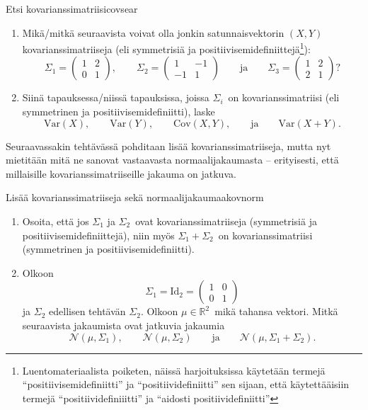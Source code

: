\documentclass[11pt,a4paper]{amsart}
\newcommand{\R}{\mathbb{R}}
\newcommand{\1}{\mathbf{1}}
\begin{document}
\begin{Exercises}{Etsi kovarianssimatriisi}{covsear}
\begin{enumerate}
\item Mikä/mitkä seuraavista voivat olla jonkin satunnaisvektorin $(X,Y)$ kovarianssimatriiseja (eli symmetrisiä ja positiivisemidefiniittejä\footnote{Luentomateriaalista poiketen, näissä harjoituksissa käytetään termejä ``positiivisemidefiniitti'' ja ``positiividefiniitti'' sen sijaan, että käytettääisiin termejä ``positiividefiniiitti'' ja ``aidosti positiividefiniitti''}): 
\[
\Sigma_1=\begin{pmatrix}
1 & 2\\
0 & 1
\end{pmatrix}, \qquad \Sigma_2=\begin{pmatrix}
1 & -1\\
-1 & 1
\end{pmatrix} \qquad \text{ja} \qquad \Sigma_3=\begin{pmatrix}
1 & 2\\
2 & 1
\end{pmatrix}?
\]

\item Siinä tapauksessa/niissä tapauksissa, joissa $\Sigma_i$ on kovarianssimatriisi (eli symmetrinen ja positiivisemidefiniitti), laske 
\[
\mathrm{Var}(X), \qquad \mathrm{Var}(Y), \qquad \mathrm{Cov}(X,Y), \qquad \text{ja} \qquad \mathrm{Var}(X+Y).
\]

\end{enumerate}
\end{Exercises}

Seuraavassakin tehtävässä pohditaan lisää kovarianssimatriiseja, mutta nyt mietitään mitä ne sanovat vastaavasta normaalijakaumasta -- erityisesti, että millaisille kovarianssimatriiseille jakauma on jatkuva.

\begin{Exercises}{Lisää kovarianssimatriiseja sekä normaalijakaumaa}{kovnorm}
\begin{enumerate}
\item Osoita, että jos $\Sigma_1$ ja $\Sigma_2$ ovat kovarianssimatriiseja (symmetrisiä ja positiivisemidefiniittejä), niin myös $\Sigma_1+\Sigma_2$ on kovarianssimatriisi (symmetrinen ja positiivisemidefiniitti).

\item Olkoon 
\[
\Sigma_1=\mathrm{Id}_2=\begin{pmatrix}
1 & 0\\
0 & 1
\end{pmatrix}
\]
ja $\Sigma_2$ edellisen tehtävän $\Sigma_2$. Olkoon $\mu\in \R^2$ mikä tahansa vektori. Mitkä seuraavista jakaumista ovat jatkuvia jakaumia
\[
\mathcal N(\mu,\Sigma_1), \qquad \mathcal N(\mu,\Sigma_2) \qquad \text{ja} \qquad \mathcal N(\mu,\Sigma_1+\Sigma_2).
\]

\end{enumerate}
\end{Exercises}
\end{document}
